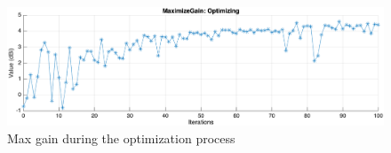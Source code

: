 \documentclass[12pt,DIV14,BCOR12mm,a4paper,footinclude=false,headinclude,parskip=half-,twoside,openright,cleardoublepage=empty,toc=index,bibliography=totoc,listof=totoc]{scrreprt}
\numberwithin{equation}{chapter}
\begin{document}
\begin{figure}
	\centering
	\includegraphics[scale=.68]{figures/optimization_max_gain.png}
	\caption{Max gain during the optimization process}
	\label{optimization max gain}
\end{figure}

\begin{figure}[!htb]
    \centering
    \begin{subfigure}{0.45\textwidth}
        \centering
    \end{subfigure}
    \begin{subfigure}{0.45\textwidth}
        \centering

\end{subfigure}
\end{figure}
\end{document}
